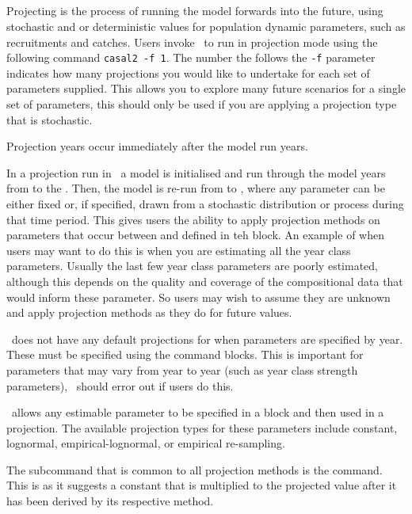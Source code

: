 \subsection{}\label{sec:projection}

Projecting is the process of running the model forwards into the future, using stochastic and or deterministic values for population dynamic parameters, such as recruitments and catches. Users invoke \CNAME\ to run in projection mode using the following command \texttt{casal2 -f 1}. The number the follows the \texttt{-f} parameter indicates how many projections you would like to undertake for each set of parameters supplied. This allows you to explore many future scenarios for a single set of parameters, this should only be used if you are applying a projection type that is stochastic.

Projection years occur immediately after the model run years.

In a projection run in \CNAME\, a model is initialised and run through the model years from  to the . Then, the model is re-run from  to , where any parameter can be either fixed or, if specified, drawn from a stochastic distribution or process during that time period. This gives users the ability to apply projection methods on parameters that occur between  and  defined in teh  block. An example of when users may want to do this is when you are estimating all the year class parameters. Usually the last few year class parameters are poorly estimated, although this depends on the quality and coverage of the compositional data that would inform these parameter. So users may wish to assume they are unknown and apply projection methods as they do for future values.

\CNAME\ does not have any default projections for when parameters are specified by year. These must be specified using the  command blocks. This is important for parameters that may vary from year to year (such as year class strength parameters), \CNAME\ should error out if users do this.

\CNAME\ allows any estimable parameter to be specified in a  block and then used in a projection. The available projection types for these parameters include constant, lognormal, empirical-lognormal, or empirical re-sampling.

The subcommand that is common to all projection methods is the  command. This is as it suggests a constant that is multiplied to the projected value after it has been derived by its respective method.

